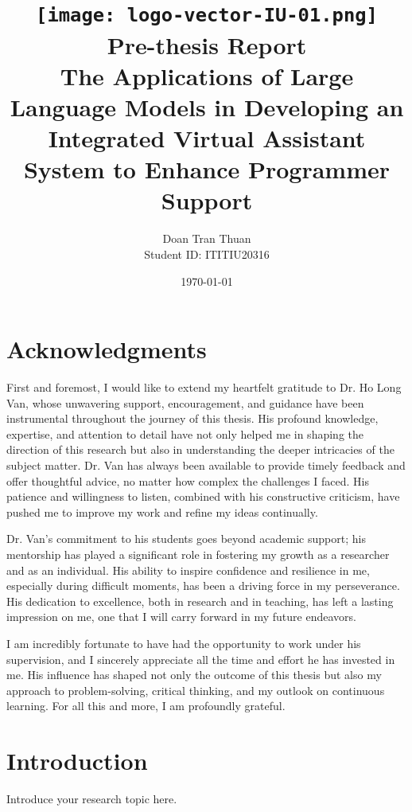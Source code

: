 \documentclass[12pt, a4paper]{report}
\title{
    \texttt{[image: logo-vector-IU-01.png]}\\[1cm]
    \textbf{Pre-thesis Report}\\
    \large{The Applications of Large Language Models in Developing an Integrated Virtual Assistant System to Enhance Programmer Support}
}
\author{Doan Tran Thuan\\Student ID: ITITIU20316}
\date{\today}
\begin{document}
\maketitle

\chapter*{Acknowledgments}

First and foremost, I would like to extend my heartfelt gratitude to Dr. Ho Long Van, whose unwavering support, encouragement, and guidance have been instrumental throughout the journey of this thesis. His profound knowledge, expertise, and attention to detail have not only helped me in shaping the direction of this research but also in understanding the deeper intricacies of the subject matter. Dr. Van has always been available to provide timely feedback and offer thoughtful advice, no matter how complex the challenges I faced. His patience and willingness to listen, combined with his constructive criticism, have pushed me to improve my work and refine my ideas continually.

Dr. Van’s commitment to his students goes beyond academic support; his mentorship has played a significant role in fostering my growth as a researcher and as an individual. His ability to inspire confidence and resilience in me, especially during difficult moments, has been a driving force in my perseverance. His dedication to excellence, both in research and in teaching, has left a lasting impression on me, one that I will carry forward in my future endeavors.

I am incredibly fortunate to have had the opportunity to work under his supervision, and I sincerely appreciate all the time and effort he has invested in me. His influence has shaped not only the outcome of this thesis but also my approach to problem-solving, critical thinking, and my outlook on continuous learning. For all this and more, I am profoundly grateful.



\tableofcontents

\chapter{Introduction}
\begin{multicols}{2}
Introduce your research topic here.
\end{multicols}

\end{document}
